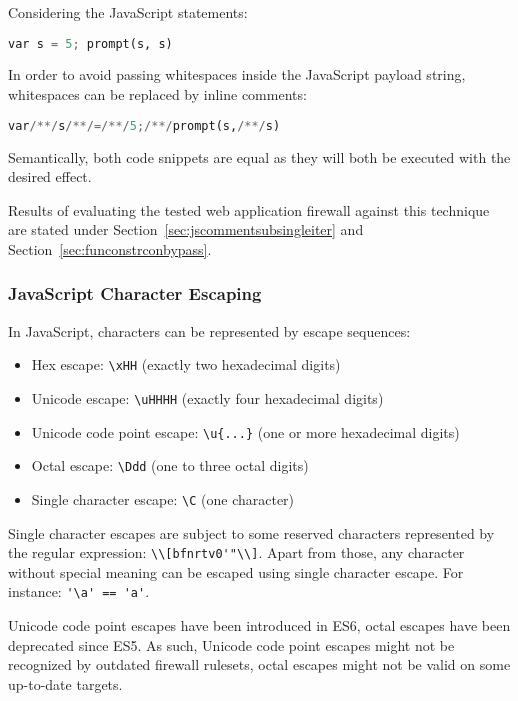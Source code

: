 Considering the JavaScript statements:

\begin{lstlisting}[style=basicStyle,language=Python]
var s = 5; prompt(s, s)
\end{lstlisting}
In order to avoid passing whitespaces inside the JavaScript payload string, whitespaces can be replaced by inline comments:

\begin{lstlisting}[style=basicStyle,language=Python]
var/**/s/**/=/**/5;/**/prompt(s,/**/s)
\end{lstlisting}
Semantically, both code snippets are equal as they will both be executed with the desired effect.

Results of evaluating the tested web application firewall against this technique are stated under Section~\ref{sec:jscommentsubsingleiter} and Section~\ref{sec:funconstrconbypass}.

\subsubsection{JavaScript Character Escaping}
\label{sec:jsescape}
In JavaScript, characters can be represented by escape sequences:

\begin{itemize}
	\item Hex escape: \verb|\xHH| (exactly two hexadecimal digits)
	\item Unicode escape: \verb|\uHHHH| (exactly four hexadecimal digits)
	\item Unicode code point escape: \verb|\u{...}| (one or more hexadecimal digits)
	\item Octal escape: \verb|\Ddd| (one to three octal digits)
	\item Single character escape: \verb|\C| (one character)
\end{itemize}

Single character escapes are subject to some reserved characters represented by the regular expression: \verb|\\[bfnrtv0'"\\]|. Apart from those, any character without special meaning can be escaped using single character escape. For instance: \verb|'\a' == 'a'|.

Unicode code point escapes have been introduced in ES6, octal escapes have been deprecated since ES5. As such, Unicode code point escapes might not be recognized by outdated firewall rulesets, octal escapes might not be valid on some up-to-date targets.

